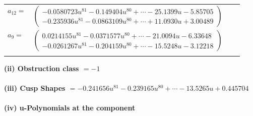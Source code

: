 \documentclass[1p]{elsarticle_modified}
\theoremstyle{definition}
\begin{document}
\begin{tabular}{m{7pt} m{180pt} m{7pt} m{180pt} }
\flushright $a_{12}=$&$\begin{pmatrix}-0.0580723 u^{81}-0.149404 u^{80}+\cdots-25.1399 u-5.85705\\-0.235936 u^{81}-0.0863109 u^{80}+\cdots+11.0930 u+3.00489\end{pmatrix}$ \\
\flushright $a_{9}=$&$\begin{pmatrix}0.0214155 u^{81}-0.0371577 u^{80}+\cdots-21.0094 u-6.33648\\-0.0261267 u^{81}-0.204159 u^{80}+\cdots-15.5248 u-3.12218\end{pmatrix}$\\&\end{tabular}
\flushleft \textbf{(ii) Obstruction class $= -1$}\\~\\
\flushleft \textbf{(iii) Cusp Shapes $= -0.241656 u^{81}-0.239165 u^{80}+\cdots-13.5265 u+0.445704$}\\~\\
\newpage\renewcommand{\arraystretch}{1}
\flushleft \textbf{(iv) u-Polynomials at the component}\newline \\
\end{document}
